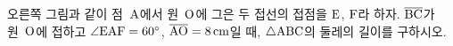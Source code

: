 \noindent\begin{minipage}[t]{0.58\linewidth}\vspace{0pt}\raggedright 오른쪽 그림과 같이 점~$\mathrm{A}$에서 원~$\mathrm{O}$에 그은 두 접선의 접점을 $\mathrm{E}$, $\mathrm{F}$라 하자. $\overline{\mathrm{BC}}$가 원~$\mathrm{O}$에 접하고 $\angle\mathrm{EAF}=60^\circ$, $\overline{\mathrm{AO}}=8\,\mathrm{cm}$일 때, $\triangle\mathrm{ABC}$의 둘레의 길이를 구하시오.\end{minipage}\hfill\begin{minipage}[t]{0.4\linewidth}\vspace{0pt}\centering \resizebox{\ifdim\width>\linewidth\linewidth\else\width\fi}{!}{}\end{minipage}\par
